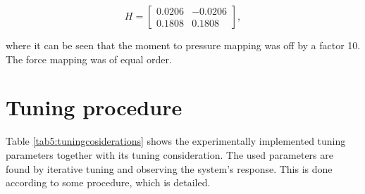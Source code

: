 \begin{equation}
    H = \begin{bmatrix} 	0.0206 &  -0.0206 \\ 
	0.1808 & 0.1808 \end{bmatrix},
    \label{eq4:revisedH}
\end{equation}

where it can be seen that the moment to pressure mapping was off by a factor 10. The force mapping was of equal order. 

\section{Tuning procedure}


Table \ref{tab5:tuningcosiderations} shows the experimentally implemented tuning parameters together with its tuning consideration. The used parameters are found by iterative tuning and observing the system's response. This is done according to some procedure, which is detailed.

